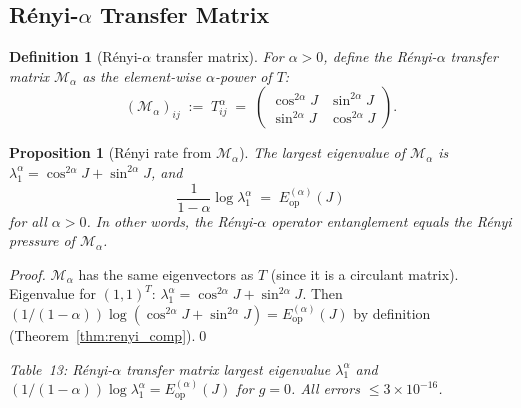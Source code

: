 \documentclass[12pt,a4paper]{article}
\newtheorem{proposition}[theorem]{Proposition}
\newtheorem{definition}[theorem]{Definition}
\begin{document}
\subsection{Rényi-$\alpha$ Transfer Matrix}

\begin{definition}[Rényi-$\alpha$ transfer matrix]
For $\alpha>0$, define the \emph{Rényi-$\alpha$ transfer matrix}
$\mathcal{M}_\alpha$ as the element-wise $\alpha$-power of $T$:
\begin{equation}\label{eq:Malpha}
  (\mathcal{M}_\alpha)_{ij} \;:=\; T_{ij}^\alpha
  \;=\;\begin{pmatrix}\cos^{2\alpha}\!J & \sin^{2\alpha}\!J\\
  \sin^{2\alpha}\!J & \cos^{2\alpha}\!J\end{pmatrix}.
\end{equation}
\end{definition}

\begin{proposition}[Rényi rate from $\mathcal{M}_\alpha$]\label{prop:renyi_rate_M}
The largest eigenvalue of $\mathcal{M}_\alpha$ is
$\lambda^\alpha_1 = \cos^{2\alpha}\!J + \sin^{2\alpha}\!J$,
and
\begin{equation}\label{eq:renyi_rate_Malpha}
  \frac{1}{1-\alpha}\log\lambda^\alpha_1
  \;=\; E^{(\alpha)}_\mathrm{op}(J)
\end{equation}
for all $\alpha>0$.  In other words, the Rényi-$\alpha$ operator entanglement equals
the Rényi pressure of $\mathcal{M}_\alpha$.
\end{proposition}

\begin{proof}
$\mathcal{M}_\alpha$ has the same eigenvectors as $T$ (since it is a circulant matrix).
Eigenvalue for $(1,1)^T$:
$\lambda^\alpha_1 = \cos^{2\alpha}\!J + \sin^{2\alpha}\!J$.
Then $(1/(1-\alpha))\log(\cos^{2\alpha}\!J+\sin^{2\alpha}\!J) = E^{(\alpha)}_\mathrm{op}(J)$
by definition (Theorem~\ref{thm:renyi_comp}).\qed
\end{proof}

\noindent\textit{Table~13: Rényi-$\alpha$ transfer matrix largest eigenvalue
$\lambda^\alpha_1$ and $(1/(1-\alpha))\log\lambda^\alpha_1 = E^{(\alpha)}_\mathrm{op}(J)$
for $g=0$.  All errors $\le 3\times 10^{-16}$.}
\end{document}
